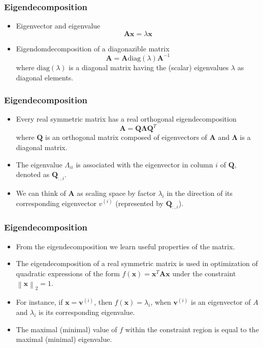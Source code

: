 \documentclass[notes]{beamer}          %
\newcommand{\vect}[1]{\bm{#1}}
\newcommand{\norm}[1]{\left\lVert#1\right\rVert}
\newcommand{\norm}[1]{\lVert#1\rVert}
\begin{document}
\begin{frame}
\frametitle{Eigendecomposition}
    \begin{itemize}
        \item Eigenvector and eigenvalue
        $$ \vect{A}\vect{x} = \lambda \vect{x}$$
        \item Eigendomdecomposition of a diagonazible matrix
        $$ \vect{A} = \vect{A} \mbox{diag}(\lambda) \vect{A}^{-1}$$
        where $\mbox{diag}(\lambda)$ is a diagonal matrix having the (scalar) eigenvalues $\lambda$ as diagonal elements.
    \end{itemize}

\end{frame}

\begin{frame}
\frametitle{Eigendecomposition}
    \begin{itemize}
        \item Every real symmetric matrix has a real orthogonal eigendecomposition
        $$ \vect{A} = \vect{Q} \vect{\Lambda} \vect{Q}^T $$
        where $\vect{Q}$ is an orthogonal matrix composed of eigenvectors of $\vect{A}$ and $\vect{\Lambda}$ is a diagonal matrix.
        \item The eigenvalue $\Lambda_{ii}$ is associated with the eigenvector in column $i$ of $\vect{Q}$, denoted as $\vect{Q}_{:,i}$.
        \item We can think of $\vect{A}$ as scaling space by factor $\lambda_i$ in the direction of its corresponding eigenvector $v^{(i)}$ (represented by $\vect{Q}_{:,i}$).
    \end{itemize}

\end{frame}

\begin{frame}
\frametitle{Eigendecomposition}
    \begin{itemize}
        \item From the eigendecomposition we learn useful properties of the matrix.
        \item The eigendecomposition of a real symmetric matrix is used in optimization of quadratic expressions of the form $f(\vect{x}) = \vect{x}^T \vect{A} \vect{x}$ under the constraint $\norm{\vect{x}}_2 = 1$.
        \item For instance, if $\vect{x}=\vect{v}^{(i)}$, then $f(\vect{x}) = \lambda_i$, when $\vect{v}^{(i)}$ is an eigenvector of $A$ and $\lambda_i$ is its corresponding eigenvalue.
        \item The maximal (minimal) value of $f$ within the constraint region is equal to the maximal (minimal) eigenvalue.
    \end{itemize}

\end{frame}
\end{document}
